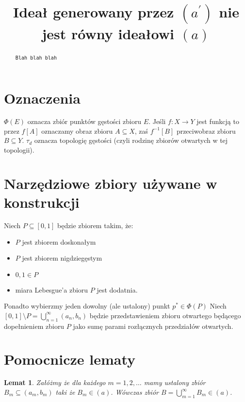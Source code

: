\documentclass[12pt]{amsart}
\author{\dummy}
\theoremstyle{plain}
\newtheorem{lemma}[theorem]{Lemat}
\theoremstyle{definition}
\theoremstyle{remark}
\newcommand{\dummy}{{\tt Blah blah blah}}
\newcommand{\aideal}{\mathit{(a)}}
\newcommand{\aidealprime}{\mathit{(a^\prime)}}
\begin{document}
\title{Ideał generowany przez $\aidealprime$ nie jest równy ideałowi $\aideal$}

\begin{abstract}
\dummy
\end{abstract}

\maketitle

\section{Oznaczenia}
$\Phi(E)$ oznacza zbiór punktów gęstości zbioru $E$.
Jeśli $f \colon X \to Y$ jest funkcją to przez
$f[A]$ oznaczamy obraz zbioru $A\subseteq X$, 
zaś $f^{-1}[B]$ przeciwobraz zbioru $B \subseteq Y$.
$\tau_d$ oznacza topologię gęstości (czyli rodzinę zbiorów otwartych w tej topologii).


\section{Narzędziowe zbiory używane w konstrukcji}

Niech $P \subseteq [0,1]$ będzie zbiorem takim, że:
\begin{itemize}
\item
  $P$ jest zbiorem doskonałym
\item
  $P$ jest zbiorem nigdziegęstym
\item
  $0, 1 \in P$
\item
  miara Lebesgue'a zbioru $P$ jest dodatnia.
\end{itemize}

Ponadto wybierzmy jeden dowolny (ale ustalony) punkt $p^* \in \Phi(P)$
Niech $[0, 1] \setminus P = \bigcup_{n=1}^\infty (a_n, b_n)$ będzie
przedstawieniem zbioru otwartego będącego dopełnieniem zbioru $P$
jako sumę parami rozłącznych przedziałów otwartych.

\section{Pomocnicze lematy}

\begin{lemma}
\label{lemat-o-sumie}
Załóżmy że dla każdego $m = 1,2,\ldots$ mamy ustalony zbiór
$B_m \subseteq (a_m, b_m)$ taki że $B_m \in \aideal$.
Wówczas zbiór $B = \bigcup_{m=1}^{\infty} B_m \in \aideal$.
\end{lemma}
\end{document}
